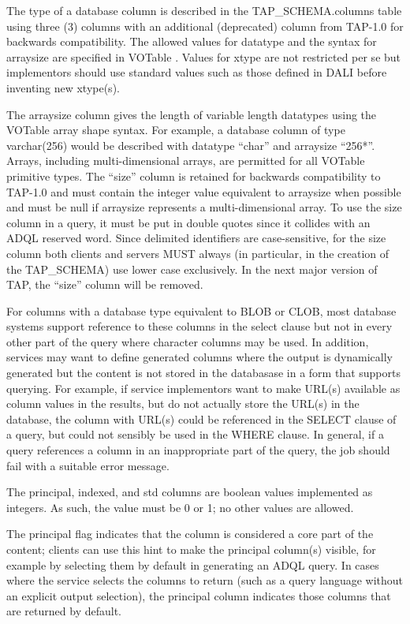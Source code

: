 \documentclass[11pt,letter]{ivoa}
\newcommand{\tapschema}{TAP\_SCHEMA}
\newcommand{\tapschema}{{%
  \relsize{-0.5}TAP\discretionary{-}{}{\kern-2pt\_}SCHEMA}}
\begin{document}
The type of a database column is described in the \tapschema.columns
table using three (3) columns with an additional (deprecated) column from TAP-1.0 
for backwards compatibility. The allowed values for datatype and the syntax for arraysize
are specified in VOTable \citep{std:VOTable}. Values for xtype are not restricted per se but 
implementors should use standard values such as those defined in DALI before 
inventing new xtype(s). 

The arraysize column gives the length of variable length datatypes using the VOTable
array shape syntax. For example, a database column of type varchar(256) would be 
described with datatype ``char'' and arraysize ``256*''. Arrays, including multi-dimensional 
arrays, are permitted for all VOTable primitive types. The ``size'' column is retained for backwards
compatibility to TAP-1.0 and must contain the integer value equivalent to arraysize when 
possible and must be null if arraysize represents a multi-dimensional array.
To use the size column in a query, it must be put in double quotes since it collides with an ADQL reserved word. Since delimited identifiers are case-sensitive, for the size column both
clients and servers MUST always (in particular, in the creation of the 
\tapschema) use lower case exclusively. In the next major version 
of TAP, the ``size'' column will be removed.

For columns with a database type equivalent to BLOB or CLOB, most database systems support
reference to these columns in the select clause but not in every other part of the query where
character columns may be used. In addition, services may want to define generated columns where the output is dynamically generated but the content is not stored in the 
databasase in a form that supports querying. For example, if service implementors want to make
URL(s) available as column values in the results, but do not actually store the URL(s) in the
database, the column with URL(s) could be referenced in the SELECT clause of a query, but could
not sensibly be used in the WHERE clause. In general, if a query references a column in an 
inappropriate part of the query, the job should fail with a suitable error message.

The principal, indexed, and std columns are boolean values implemented as integers. As such, 
the value must be 0 or 1; no other values are allowed.

The principal flag indicates that the column is considered a core part of the 
content; clients can use this hint to make the principal column(s) visible, for 
example by selecting them by default in generating an ADQL query. In cases where 
the service selects the columns to return (such as a query language without an 
explicit output selection), the principal column indicates those columns that 
are returned by default. 
\end{document}
